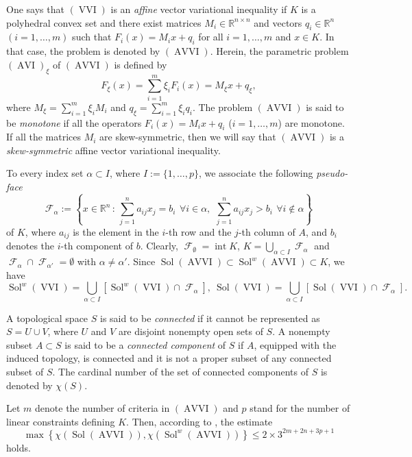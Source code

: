 \documentclass[smallextended,envcountsect]{svjour3}       %
\DeclareMathOperator{\Sol}{Sol}
\DeclareMathOperator{\AVVI}{AVVI}
\DeclareMathOperator{\AVI}{AVI}
\DeclareMathOperator{\F}{\mathcal{F}}
\DeclareMathOperator{\VVI}{VVI}
\DeclareMathOperator{\inte}{int}
\begin{document}
One says that $(\VVI)$ is an {\it affine} vector variational inequality 
if $K$ is a polyhedral convex set and there exist matrices
$M_i\in\mathbb R^{n\times n}$ and vectors $q_i\in\mathbb R^n$
$(i=1,\dots,m)$ such that $F_i(x)=M_ix+q_i$ for all $i=1,\dots,m$
and $x\in K$. In that case, the problem is denoted
by $(\AVVI)$. Herein, the parametric problem $(\AVI)_{\xi}$ of $(\AVVI)$ is defined by  $$F_{\xi}(x)= \displaystyle\sum_{i=1}^m\xi_iF_i(x)=M_{\xi}x+q_{\xi},$$ where $M_{\xi}=\displaystyle\sum_{i=1}^m\xi_iM_i$ and $q_{\xi}=\displaystyle\sum_{i=1}^m\xi_iq_i$. 
The problem $(\AVVI)$ is said to be \textit{monotone} if all the operators $F_i(x)=M_ix+q_i$ ($i=1,\dots,m$) are monotone. If all the matrices $M_i$ are skew-symmetric, then we will say that $(\AVVI)$ is a \textit{skew-symmetric} affine vector variational inequality.

To every index set $\alpha\subset I$, where $I:=\{1,\dots,p\}$, we associate  the following {\em pseudo-face}
$$\mathcal{F}_\alpha:=\left\{x\in {\mathbb R}^n\,:\, \sum_{j=1}^{n}a_{ij}x_j=b_i\ \,
\forall i\in\alpha,\ \, \sum_{j=1}^{n}a_{ij}x_j> b_i\ \,\forall i\notin\alpha\right\}$$ of $K$, where $a_{ij}$ is the element in the $i$-th row and the $j$-th column of $A$, and $b_i$ denotes the $i$-th component of $b$.
Clearly, $\F_{\emptyset}=\inte K$, $K=\displaystyle\bigcup_{\alpha\subset I}\F_{\alpha}$ and $\F_{\alpha}\cap \F_{\alpha'}=\emptyset$ with $\alpha \neq \alpha'$. 
Since $\Sol(\AVVI)\subset\Sol^w(\AVVI)\subset K$,  we have 
\begin{equation}\label{quasiface}
\Sol^w(\VVI)=\bigcup_{\alpha\subset I}\left[ \Sol^w(\VVI)\cap \F_{\alpha}\right], \ \Sol(\VVI)=\bigcup_{\alpha\subset I}\left[ \Sol(\VVI)\cap \F_{\alpha}\right].
\end{equation}

A topological space $S$ is said to be \textit{connected} if it cannot be represented as $S=U\cup V$, where $U$ and $V$ are disjoint nonempty open sets of $S$. A nonempty subset $A\subset S$ is said to be a \textit{connected component} of $S$ if $A$, equipped with the induced topology, is connected and it is not a proper subset of any connected subset of $S$. The cardinal number of the set of connected components of $S$ is denoted by $\chi(S)$. 

\begin{remark} Let $m$ denote the number of criteria in $(\AVVI)$ and $p$ stand for the number of linear constraints defining $K$. Then, according to \cite[Theorem~3.3]{Hieu16}, the estimate
	\begin{equation}\label{affine_bounds}
\max\left\lbrace \chi(\Sol(\AVVI)),\chi(\Sol^w(\AVVI)) \right\rbrace \leq 2\times3^{2m+2n+3p+1}
\end{equation} holds.
\end{remark}
\end{document}
